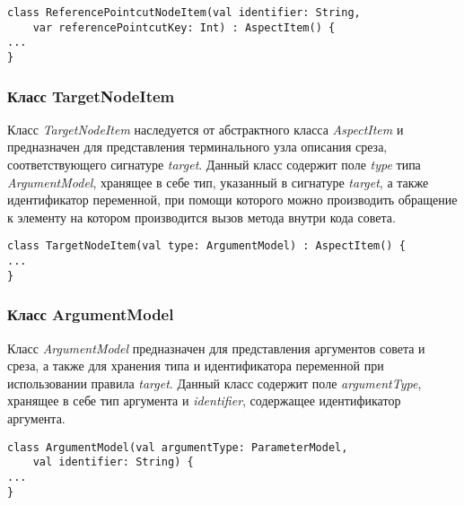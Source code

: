\begin{lstlisting}[style={java}, label={lst:ReferencePointcutNodeItem},
  caption={Класс ReferencePointcutNodeItem}]
class ReferencePointcutNodeItem(val identifier: String,
	var referencePointcutKey: Int) : AspectItem() {
...
}
\end{lstlisting}
\subsubsection{Класс TargetNodeItem}
\label{ssub:TargetNodeItem}
Класс \textit{TargetNodeItem} наследуется от абстрактного класса
\textit{AspectItem} и предназначен для представления терминального узла
описания среза, соответствующего сигнатуре \textit{target}.
Данный класс содержит поле \textit{type} типа \textit{ArgumentModel}, хранящее
в себе тип, указанный в сигнатуре \textit{target}, а также идентификатор
переменной, при помощи которого можно производить обращение к элементу на
котором производится вызов метода внутри кода совета.

\begin{lstlisting}[style={java}, label={lst:TargetNodeItem},
  caption={Класс TargetNodeItem}]
class TargetNodeItem(val type: ArgumentModel) : AspectItem() {
...
}
\end{lstlisting}
\subsubsection{Класс ArgumentModel}
\label{ssub:ArgumentModel}
Класс \textit{ArgumentModel} предназначен для представления аргументов совета и
среза, а также для хранения типа и идентификатора переменной при использовании
правила \textit{target}.
Данный класс содержит поле \textit{argumentType}, хранящее в себе тип аргумента
и \textit{identifier}, содержащее идентификатор аргумента.

\begin{lstlisting}[style={java}, label={lst:ArgumentModel},
  caption={Класс ArgumentModel}]
class ArgumentModel(val argumentType: ParameterModel,
	val identifier: String) {
...
}
\end{lstlisting}
